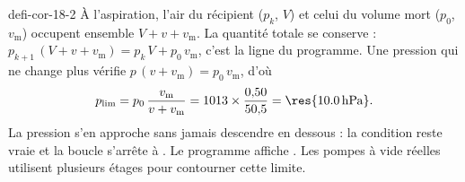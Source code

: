 \begin{blocEdition}{defi-cor-18-2}
\label{figedition-defi-cor-18-2-1}
À l'aspiration, l'air du récipient ($p_k$, $V$) et celui du volume mort ($p_0$, $v_\mathrm{m}$) occupent ensemble $V+v+v_\mathrm{m}$.
La quantité totale se conserve : $p_{k+1}\,(V+v+v_\mathrm{m})=p_k\,V+p_0\,v_\mathrm{m}$, c'est la ligne du programme. Une pression
qui ne change plus vérifie $p\,(v+v_\mathrm{m})=p_0\,v_\mathrm{m}$, d'où
\[p_\mathrm{lim}=p_0\,\frac{v_\mathrm{m}}{v+v_\mathrm{m}}=1013\times\frac{0{,}50}{50{,}5}=\res{\qty{10,0}{hPa}}.\]
La pression s'en approche sans jamais descendre en dessous : la condition  reste vraie et la boucle s'arrête à
. Le programme affiche . Les pompes à vide réelles utilisent plusieurs étages pour
contourner cette limite.
\end{blocEdition}

